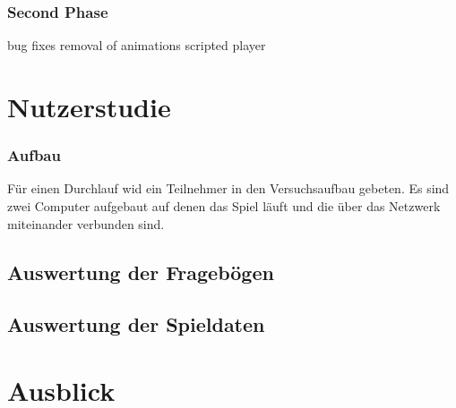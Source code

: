 \subsection{Second Phase}
bug fixes\newline
removal of animations\newline
scripted player\newline

\chapter{Nutzerstudie}
\subsection{Aufbau}
Für einen Durchlauf wid ein Teilnehmer in den Versuchsaufbau gebeten. Es sind zwei Computer aufgebaut auf denen das Spiel läuft und die über das Netzwerk miteinander verbunden sind.

\section{Auswertung der Fragebögen}
\section{Auswertung der Spieldaten}

\chapter{Ausblick}

\newpage



